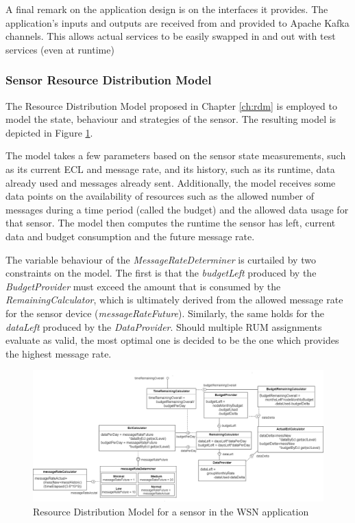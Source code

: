 A final remark on the application design is on the interfaces it provides. The application's inputs and outputs are received from and provided to Apache Kafka channels. This allows actual services to be easily swapped in and out with test services (even at runtime)

\subsubsection{Sensor Resource Distribution Model}
The Resource Distribution Model proposed in Chapter \ref{ch:rdm} is employed to model the state, behaviour and strategies of the sensor. The resulting model is depicted in Figure \ref{fig:sensit_rdm}. 

The model takes a few parameters based on the sensor state measurements, such as its current ECL and message rate, and its history, such as its runtime, data already used and messages already sent. Additionally, the model receives some data points on the availability of resources such as the allowed number of messages during a time period (called the budget) and the allowed data usage for that sensor. The model then computes the runtime the sensor has left, current data and budget consumption and the future message rate. 

The variable behaviour of the \emph{MessageRateDeterminer} is curtailed by two constraints on the model. The first is that the \emph{budgetLeft} produced by the \emph{BudgetProvider} must exceed the amount that is consumed by the \emph{RemainingCalculator}, which is ultimately derived from the allowed message rate for the sensor device (\emph{messageRateFuture}). Similarly, the same holds for the \emph{dataLeft} produced by the \emph{DataProvider}. Should multiple RUM assignments evaluate as valid, the most optimal one is decided to be the one which provides the highest message rate.

\begin{figure}
\centering
\includegraphics[width=1.1\textwidth]{resources/img/sensit_rdm_sideways.png}
\caption{Resource Distribution Model for a sensor in the \idsystems\sensit WSN application}
\label{fig:sensit_rdm}
\end{figure}

